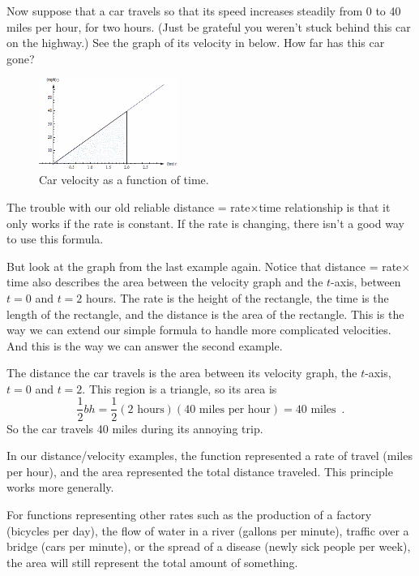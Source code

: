 \begin{example}
Now suppose that a car travels so that its speed increases steadily from 0 to 40 miles per hour, for two hours. (Just be grateful you weren’t stuck behind this car on the highway.) See the graph of its velocity in below. How far has this car gone?

\begin{figure}[!ht]
  \centering
    \includegraphics[width=0.4\textwidth]{img/chap5/image002.png}
    \caption{Car velocity as a function of time.}
    \label{fig:5-2-distance2}
\end{figure}

\begin{solution}
The trouble with our old reliable distance = rate$\times$time relationship is that it only works if the rate is constant. If the rate is changing, there isn’t a good way to use this formula.

But look at the graph from the last example again. Notice that distance = rate$\times$time also describes the area between the velocity graph and the $t$-axis, between $t=0$ and $t=2$ hours. The rate is the height of the rectangle, the time is the length of the rectangle, and the distance is the area of the rectangle. This is the way we can extend our simple formula to handle more complicated velocities. And this is the way we can answer the second example.

The distance the car travels is the area between its velocity graph, the $t$-axis, $t=0$ and $t=2$. This region is a triangle, so its area is
$$\frac{1}{2}bh = \frac{1}{2}(2 \text{ hours})(40 \text{ miles per hour}) = 40 \text{ miles}\enspace .$$
So the car travels 40 miles during its annoying trip.
\end{solution}\end{example}

In our distance/velocity examples, the function represented a rate of travel (miles per hour), and the area represented the total distance traveled. This principle works more generally.

For functions representing other rates such as the production of a factory (bicycles per day), the flow of water in a river (gallons per minute), traffic over a bridge (cars per minute), or the spread of a disease (newly sick people per week), the area will still represent the total amount of something.


